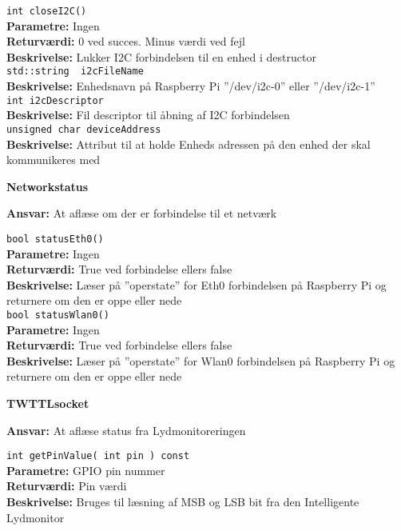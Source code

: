 \verb+int closeI2C() +\\
\textbf{Parametre:}   Ingen \\
\textbf{Returværdi:}  0 ved succes. Minus værdi ved fejl \\
\textbf{Beskrivelse:} Lukker I2C forbindelsen til en enhed i destructor \\

\verb+std::string  i2cFileName +\\
\textbf{Beskrivelse:} Enhedsnavn på Raspberry Pi ''/dev/i2c-0'' eller ''/dev/i2c-1'' \\

\verb+int i2cDescriptor +\\
\textbf{Beskrivelse:} Fil descriptor til åbning af I2C forbindelsen \\

\verb+unsigned char deviceAddress +\\
\textbf{Beskrivelse:} Attribut til at holde Enheds adressen på den enhed der skal kommunikeres med  \\

{\centering
\textbf{Networkstatus}\par
}
\textbf{Ansvar:} At aflæse om der er forbindelse til et netværk \

\verb+bool statusEth0() +\\
\textbf{Parametre:}   Ingen \\
\textbf{Returværdi:}  True ved forbindelse ellers false \\
\textbf{Beskrivelse:} Læser på ''operstate'' for Eth0 forbindelsen på Raspberry Pi og returnere om den er oppe eller nede \\

\verb+bool statusWlan0() +\\
\textbf{Parametre:}   Ingen \\
\textbf{Returværdi:}  True ved forbindelse ellers false \\
\textbf{Beskrivelse:} Læser på ''operstate'' for Wlan0 forbindelsen på Raspberry Pi og returnere om den er oppe eller nede \\

{\centering
\textbf{TWTTLsocket}\par
}
\textbf{Ansvar:} At aflæse status fra Lydmonitoreringen \

\verb+int getPinValue( int pin ) const +\\
\textbf{Parametre:}   GPIO pin nummer \\
\textbf{Returværdi:}  Pin værdi \\
\textbf{Beskrivelse:} Bruges til læsning af MSB og LSB bit fra den Intelligente Lydmonitor \\

